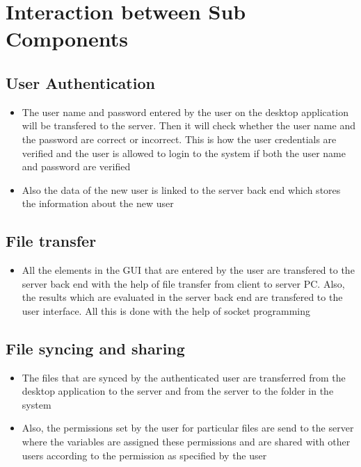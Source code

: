 \documentclass{article}
\begin{document}
	\section{Interaction between Sub Components}
		\subsection{User Authentication}
			\begin{itemize}
				\item The user name and password entered by the user on the desktop application will be transfered to the server. Then it will check whether the user name and the password are correct or incorrect. This is how the user credentials are verified and the user is allowed to login to the system if both the user name and password are verified
				\item Also the data of the new user is linked to the server back end which stores the information about the new user
			\end{itemize}
		\subsection{File transfer}
			\begin{itemize}
				\item All the elements in the GUI that are entered by the user are transfered to the server back end with the help of file transfer from client to server PC. Also, the results which are evaluated in the server back end are transfered to the user interface. All this is done with the help of socket programming
			\end{itemize}
		\subsection{File syncing and sharing}
			\begin{itemize}
				\item The files that are synced by the authenticated user are transferred from the desktop application to the server and from the server to the folder in the system
				\item Also, the permissions set by the user for particular files are send to the server where the variables are assigned these permissions and are shared with other users according to the permission as specified by the user
			\end{itemize}
\end{document}
